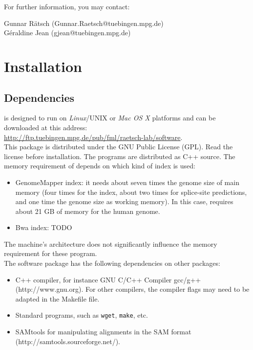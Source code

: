 \documentclass{article}
\begin{document}
For further information, you may contact:
\begin{center}
Gunnar R\"atsch (Gunnar.Raetsch@tuebingen.mpg.de)\\
G\'eraldine Jean (gjean@tuebingen.mpg.de)
\end{center}


\section{Installation}
\label{sec:installation}

\subsection{Dependencies}
\label{sec:dependencies}
\PALMapper{} is designed to run on \emph{Linux}/UNIX or \emph{Mac OS X} platforms and
can be downloaded at this address:\\
\url{http://ftp.tuebingen.mpg.de/pub/fml/raetsch-lab/software}.\\
This package is distributed under the GNU Public License (GPL). Read
the license before installation. The programs are distributed as C++
source. The memory requirement of \PALMapper{} depends on which kind of index is used:
\begin{itemize}
\item GenomeMapper index: it needs about seven times the genome size
  of main memory (four times for the index, about two times for
  splice-site predictions, and one time the genome size as working
  memory). In this case, \PALMapper{} requires about 21 GB of memory
  for the human genome. 
\item Bwa index: TODO
\end{itemize}
The machine’s architecture does not significantly influence the memory requirement for
these program.\\

The software package has the following dependencies on other packages:
\begin{itemize}
\item C++ compiler, for instance GNU C/C++ Compiler gcc/g++
(http://www.gnu.org). For other compilers, the compiler flags may need to be
adapted in the Makefile file.
\item Standard programs, such as \texttt{wget}, \texttt{make}, etc.
\item SAMtools for manipulating alignments in the SAM format
(http://samtools.sourceforge.net/).
\end{itemize}
\end{document}
